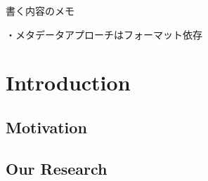  書く内容のメモ

・メタデータアプローチはフォーマット依存

\fi

\chapter{Introduction}

\section{Motivation}

\section{Our Research}
